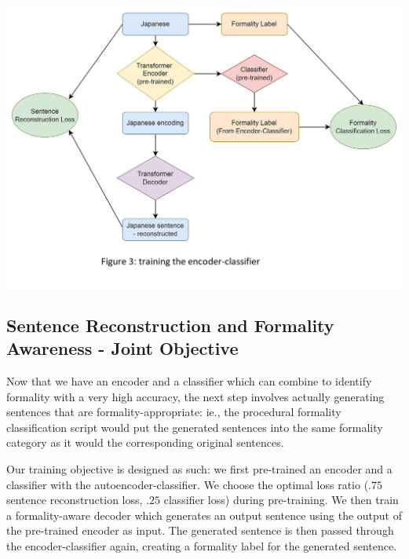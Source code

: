 \documentclass[11pt]{article}
\begin{document}
\includegraphics{images/encoder_classifier.jpg}

\subsection{Sentence Reconstruction and Formality Awareness - Joint Objective}

Now that we have an encoder and a classifier which can combine to identify formality with a very high accuracy, the next step involves actually generating sentences that are formality-appropriate: ie., the procedural formality classification script would put the generated sentences into the same formality category as it would the corresponding original sentences.

Our training objective is designed as such: we first pre-trained an encoder and a classifier with the autoencoder-classifier. We choose the optimal loss ratio ($.75$ sentence reconstruction loss, $.25$ classifier loss) during pre-training. We then train a formality-aware decoder which generates an output sentence using the output of the pre-trained encoder as input. The generated sentence is then passed through the encoder-classifier again, creating a formality label for the generated sentence.
\end{document}
